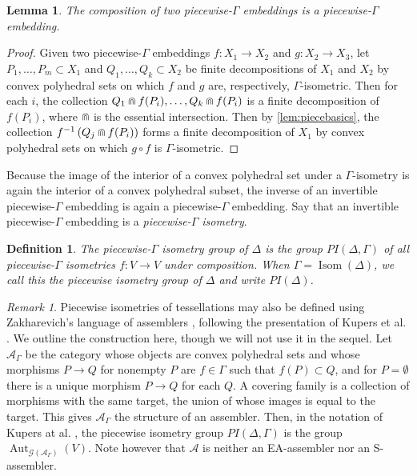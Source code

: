 \documentclass[11pt]{amsart}
\def\cA{\mathcal A}
\def\cG{\mathcal G}
\newtheorem{lemma}[theorem]{Lemma}
\newtheorem{definition}[theorem]{Definition}
\numberwithin{table}{section}
\numberwithin{figure}{section}
\theoremstyle{remark}
\newtheorem{remark}[theorem]{Remark}
\DeclareMathOperator{\Isom}{Isom}
\DeclareMathOperator{\Aut}{Aut}
\begin{document}
\begin{lemma} \label{lem:compose}
  The composition of two piecewise-$\Gamma$ embeddings is a
  piecewise-$\Gamma$ embedding.
\end{lemma}
\begin{proof}
  Given two piecewise-$\Gamma$ embeddings $f:X_1 \to X_2$ and
  $g:X_2 \to X_3$, let $P_1,\dotsc, P_m \subset X_1$ and
  $Q_1,\dotsc, Q_k \subset X_2$ be finite decompositions of $X_1$ and
  $X_2$ by convex polyhedral sets on which $f$ and $g$ are,
  respectively, $\Gamma$-isometric. Then for each $i$, the collection
  $Q_1 \doublecap f(P_i), \dotsc, Q_k \doublecap f(P_i)$ is a finite
  decomposition of $f(P_i)$, where $\doublecap$ is the essential
  intersection. Then by \cref{lem:piecebasics}, the collection
  $f^{-1}\left(Q_j \doublecap f(P_i) \right)$ forms a finite
  decomposition of $X_1$ by convex polyhedral sets on which $g\circ f$
  is $\Gamma$-isometric.
\end{proof}

Because the image of the interior of a convex polyhedral set under a
$\Gamma$-isometry is again the interior of a convex
polyhedral subset, the inverse of an invertible piecewise-$\Gamma$
embedding is again a piecewise-$\Gamma$ embedding. Say that an
invertible piecewise-$\Gamma$ embedding is a {\em piecewise-$\Gamma$
  isometry}.

\begin{definition}
  The {\em piecewise-$\Gamma$ isometry group of $\Delta$} is the group
  $PI(\Delta,\Gamma)$ of all piecewise-$\Gamma$ isometries $f:V \to V$
  under composition. When $\Gamma = \Isom(\Delta)$, we call this the
  {\em piecewise isometry group of $\Delta$} and write $PI(\Delta)$.
\end{definition}

\begin{remark}\label{rem:zakh}
  Piecewise isometries of tessellations may also be defined using
Zakharevich's language of assemblers \cite{Zak17}, following the
presentation of Kupers et al. \cite{Kup24}. We outline the
construction here, though we will not use it in the sequel. Let
$\cA_\Gamma$ be the category whose objects are convex polyhedral sets
and whose morphisms $P\to Q$ for nonempty $P$ are $f\in \Gamma$ such
that $f(P) \subset Q$, and for $P=\emptyset$ there is a unique
morphism $P\to Q$ for each $Q$. A covering family is a collection of
morphisms with the same target, the union of whose images is equal to
the target. This gives $\cA_\Gamma$ the structure of an
assembler. Then, in the notation of Kupers at al. \cite{Kup24}, the
piecewise isometry group $PI(\Delta, \Gamma)$ is the group
$\Aut_{\cG(\cA_\Gamma)}(V)$. Note however that $\cA$ is neither an
EA-assembler nor an S-assembler.
\end{remark}
\end{document}
